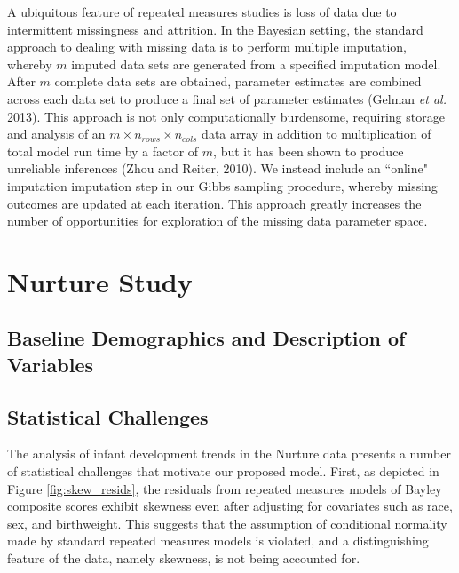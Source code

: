 \documentclass[useAMS,referee]{biom}
\begin{document}
A ubiquitous feature of repeated measures studies is loss of data due to intermittent missingness and attrition. In the Bayesian setting, the standard approach to dealing with missing data is to perform multiple imputation, whereby $m$ imputed data sets are generated from a specified imputation model. After $m$ complete data sets are obtained, parameter estimates are combined across each data set to produce a final set of parameter estimates (Gelman \textit{et al.} 2013). This approach is not only computationally burdensome, requiring storage and analysis of an $m \times n_{rows} \times n_{cols}$ data array in addition to multiplication of total model run time by a factor of $m$, but it has been shown to produce unreliable inferences (Zhou and Reiter, 2010). We instead include an ``online" imputation imputation step in our Gibbs sampling procedure, whereby missing outcomes are updated at each iteration. This approach greatly increases the number of opportunities for exploration of the missing data parameter space.

\newpage

\section{Nurture Study}
\label{s:nurt}
\subsection{Baseline Demographics and Description of Variables}

\subsection{Statistical Challenges}

The analysis of infant development trends in the Nurture data presents a number of statistical challenges that motivate our proposed model. First, as depicted in Figure \ref{fig:skew_resids}, the residuals from repeated measures models of Bayley composite scores exhibit skewness even after adjusting for covariates such as race, sex, and birthweight. This suggests that the assumption of conditional normality made by standard repeated measures models is violated, and a distinguishing feature of the data, namely skewness, is not being accounted for. 
\end{document}
